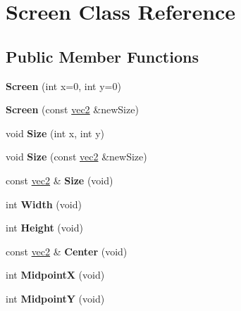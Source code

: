 \hypertarget{class_screen}{\section{Screen Class Reference}
\label{class_screen}
}
\subsection*{Public Member Functions}
\begin{DoxyCompactItemize}
\item 
\hypertarget{class_screen_ad97151af2e654778bad86043c32fe19f}{{\bfseries Screen} (int x=0, int y=0)}\label{class_screen_ad97151af2e654778bad86043c32fe19f}

\item 
\hypertarget{class_screen_a7b45282430392ffa8b5891936363f8f8}{{\bfseries Screen} (const \hyperlink{struct_angel_1_1vec2}{vec2} \&new\-Size)}\label{class_screen_a7b45282430392ffa8b5891936363f8f8}

\item 
\hypertarget{class_screen_a478c5176fd4fdc8af48f2bd7e824329d}{void {\bfseries Size} (int x, int y)}\label{class_screen_a478c5176fd4fdc8af48f2bd7e824329d}

\item 
\hypertarget{class_screen_a5fa4071af08df619e7cb4311bc0efb45}{void {\bfseries Size} (const \hyperlink{struct_angel_1_1vec2}{vec2} \&new\-Size)}\label{class_screen_a5fa4071af08df619e7cb4311bc0efb45}

\item 
\hypertarget{class_screen_a6f22423a037d9cf406d3ca4dd79b94b5}{const \hyperlink{struct_angel_1_1vec2}{vec2} \& {\bfseries Size} (void)}\label{class_screen_a6f22423a037d9cf406d3ca4dd79b94b5}

\item 
\hypertarget{class_screen_aa9a4a2e113af54d7164463bef8e78471}{int {\bfseries Width} (void)}\label{class_screen_aa9a4a2e113af54d7164463bef8e78471}

\item 
\hypertarget{class_screen_ad532ef57bbdb9a1e1540812a02eece23}{int {\bfseries Height} (void)}\label{class_screen_ad532ef57bbdb9a1e1540812a02eece23}

\item 
\hypertarget{class_screen_a00be376c569ac4b71d770f34e297f332}{const \hyperlink{struct_angel_1_1vec2}{vec2} \& {\bfseries Center} (void)}\label{class_screen_a00be376c569ac4b71d770f34e297f332}

\item 
\hypertarget{class_screen_a434f489a1b9d40319f7f6dbbf11db456}{int {\bfseries Midpoint\-X} (void)}\label{class_screen_a434f489a1b9d40319f7f6dbbf11db456}

\item 
\hypertarget{class_screen_a7b574e8ded50718dc1523180102e2f41}{int {\bfseries Midpoint\-Y} (void)}\label{class_screen_a7b574e8ded50718dc1523180102e2f41}

\end{DoxyCompactItemize}
